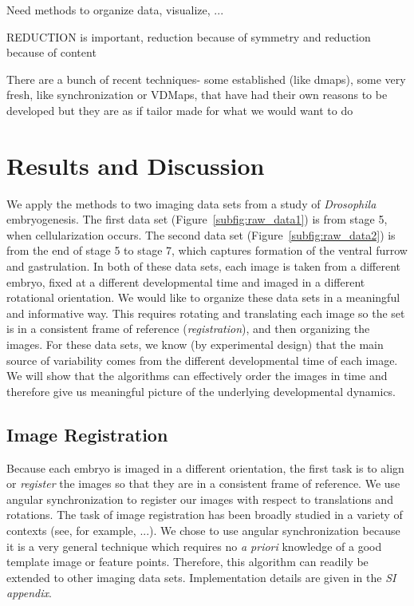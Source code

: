 \documentclass{pnastwo}
\begin{document}
\begin{article}
Need methods to organize data, visualize, ...

REDUCTION is important, reduction because of symmetry and reduction because of content

There are a bunch of recent techniques- some established (like dmaps), some very fresh, like synchronization or VDMaps,  that have had their own reasons to be developed but they are as if tailor made for what we would want to do



\section{Results and Discussion}

We apply the methods to two imaging data sets from a study of {\it Drosophila} embryogenesis.
%
The first data set (Figure~\ref{subfig:raw_data1}) is from stage 5, when cellularization occurs. 
%
The second data set (Figure~\ref{subfig:raw_data2}) is from the end of stage 5 to stage 7, which captures formation of the ventral furrow and gastrulation.
%
In both of these data sets, each image is taken from a different embryo, fixed at a different developmental time and imaged in a different rotational orientation.
%
We would like to organize these data sets in a meaningful and informative way.
%
This requires rotating and translating each image so the set is in a consistent frame of reference ({\it registration}), and then organizing the images. 
%
For these data sets, we know (by experimental design) that the main source of variability comes from the different developmental time of each image.
%
We will show that the algorithms can effectively order the images in time and therefore give us meaningful picture of the underlying developmental dynamics. 


\subsection{Image Registration}

Because each embryo is imaged in a different orientation, the first task is to align or {\em register} the images so that they are in a consistent frame of reference.
%
We use angular synchronization \cite{singer2011angular} to register our images with respect to translations and rotations. 
%
The task of image registration has been broadly studied in a variety of contexts (see, for example, ...).
%
We chose to use angular synchronization because it is a very general technique which requires no {\em a priori} knowledge of a good template image or feature points. 
%
Therefore, this algorithm can readily be extended to other imaging data sets. 
%
Implementation details are given in the {\it SI appendix}. 


\end{article}
\end{document}

